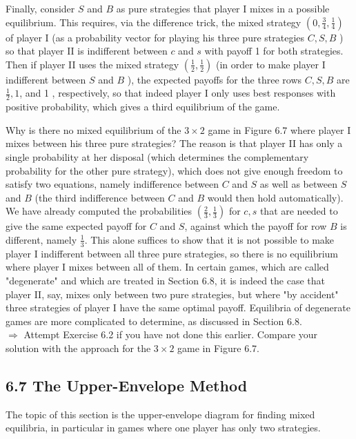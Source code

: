 \documentclass[12pt]{article}
\begin{document}
Finally, consider $S$ and $B$ as pure strategies that player I mixes in a possible equilibrium. This requires, via the difference trick, the mixed strategy $\left(0, \frac{3}{4}, \frac{1}{4}\right)$ of player I (as a probability vector for playing his three pure strategies $C, S, B$ ) so that player II is indifferent between $c$ and $s$ with payoff 1 for both strategies. Then if player II uses the mixed strategy $\left(\frac{1}{2}, \frac{1}{2}\right)$ (in order to make player I indifferent between $S$ and $B$ ), the expected payoffs for the three rows $C, S, B$ are $\frac{1}{2}, 1$, and 1 , respectively, so that indeed player I only uses best responses with positive probability, which gives a third equilibrium of the game.

Why is there no mixed equilibrium of the $3 \times 2$ game in Figure 6.7 where player I mixes between his three pure strategies? The reason is that player II has only a single probability at her disposal (which determines the complementary probability for the other pure strategy), which does not give enough freedom to satisfy two equations, namely indifference between $C$ and $S$ as well as between $S$ and $B$ (the third indifference between $C$ and $B$ would then hold automatically). We have already computed the probabilities $\left(\frac{2}{3}, \frac{1}{3}\right)$ for $c, s$ that are needed to give the same expected payoff for $C$ and $S$, against which the payoff for row $B$ is different, namely $\frac{1}{3}$. This alone suffices to show that it is not possible to make player I indifferent between all three pure strategies, so there is no equilibrium where player I mixes between all of them. In certain games, which are called "degenerate" and which are treated in Section 6.8, it is indeed the case that player II, say, mixes only between two pure strategies, but where "by accident" three strategies of player I have the same optimal payoff. Equilibria of degenerate games are more complicated to determine, as discussed in Section 6.8.\\
$\Rightarrow$ Attempt Exercise 6.2 if you have not done this earlier. Compare your solution with the approach for the $3 \times 2$ game in Figure 6.7.

\subsection*{6.7 The Upper-Envelope Method}
The topic of this section is the upper-envelope diagram for finding mixed equilibria, in particular in games where one player has only two strategies.
\end{document}
